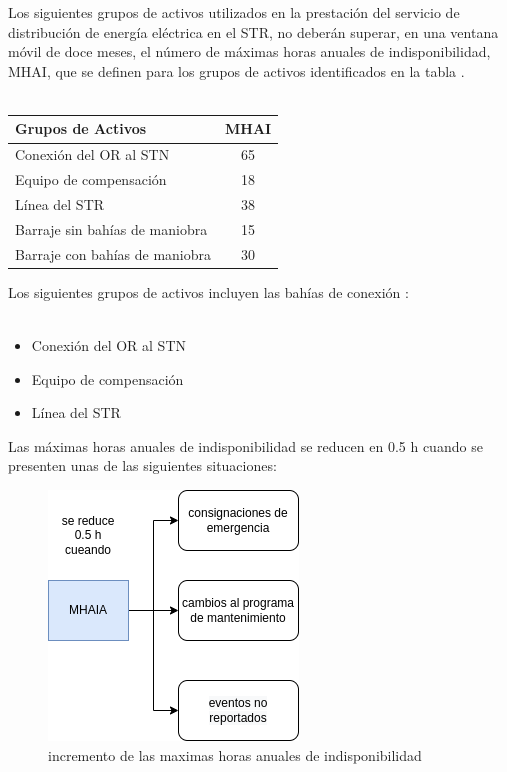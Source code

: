 \documentclass[a5paper]{book}%
\begin{document}
  Los siguientes grupos de activos utilizados en la prestación del servicio de distribución de energía eléctrica en el STR, no deberán superar, en una ventana móvil de doce meses, el número de máximas horas anuales de indisponibilidad, MHAI, que se definen para los grupos de activos identificados en la tabla \cite{CREG0152018}.\\\\

  \begin{tabular}[H]{|p{6cm}|c|}
    \hline
Grupos de Activos&
MHAI\\\hline
Conexión del OR al STN&
65\\\hline
Equipo de compensación&
18\\\hline
Línea del STR&
38\\\hline
Barraje sin bahías de maniobra&
15\\\hline
Barraje con bahías de maniobra&
30\\\hline

  \end{tabular}

  Los siguientes  grupos de activos incluyen las bahías de conexión :\\\\
  \begin{itemize}
  \item Conexión del OR al STN
  \item Equipo de compensación
  \item Línea del \ac{STR}
  \end{itemize}

  Las máximas horas anuales de indisponibilidad  se reducen en 0.5 h cuando se presenten unas de las siguientes situaciones:
  
  \begin{figure}[H]
    \centering
    \caption{incremento de las maximas horas anuales de indisponibilidad}
    \label{fig:mhaia}
    \includegraphics[width=0.6\linewidth]{MHAIA}
  \end{figure}
  
\end{document}
